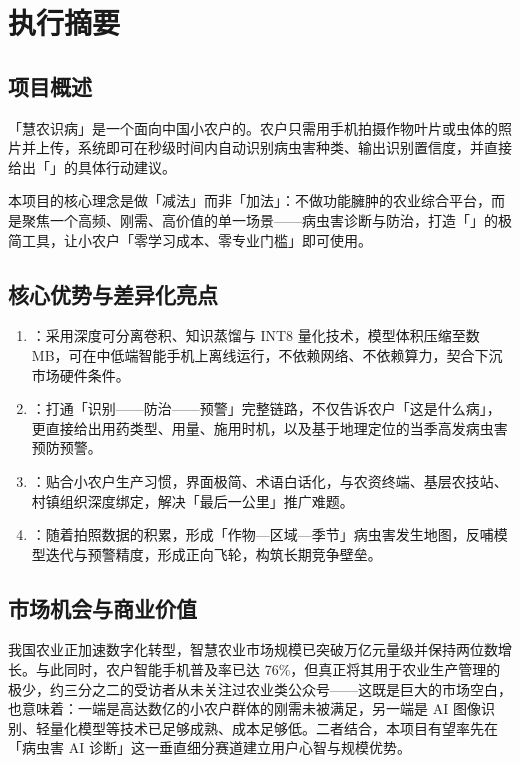 \chapter{执行摘要}

\section{项目概述}

「慧农识病」是一个面向中国小农户的。农户只需用手机拍摄作物叶片或虫体的照片并上传，系统即可在秒级时间内自动识别病虫害种类、输出识别置信度，并直接给出「」的具体行动建议。

本项目的核心理念是做「减法」而非「加法」：不做功能臃肿的农业综合平台，而是聚焦一个高频、刚需、高价值的单一场景——病虫害诊断与防治，打造「」的极简工具，让小农户「零学习成本、零专业门槛」即可使用。

\section{核心优势与差异化亮点}

\begin{enumerate}[leftmargin=1.6em]
  \item {}：采用深度可分离卷积、知识蒸馏与 INT8 量化技术，模型体积压缩至数 MB，可在中低端智能手机上离线运行，不依赖网络、不依赖算力，契合下沉市场硬件条件。
  \item {}：打通「识别——防治——预警」完整链路，不仅告诉农户「这是什么病」，更直接给出用药类型、用量、施用时机，以及基于地理定位的当季高发病虫害预防预警。
  \item {}：贴合小农户生产习惯，界面极简、术语白话化，与农资终端、基层农技站、村镇组织深度绑定，解决「最后一公里」推广难题。
  \item {}：随着拍照数据的积累，形成「作物—区域—季节」病虫害发生地图，反哺模型迭代与预警精度，形成正向飞轮，构筑长期竞争壁垒。
\end{enumerate}

\section{市场机会与商业价值}

我国农业正加速数字化转型，智慧农业市场规模已突破万亿元量级并保持两位数增长。与此同时，农户智能手机普及率已达 76\%，但真正将其用于农业生产管理的极少，约三分之二的受访者从未关注过农业类公众号——这既是巨大的市场空白，也意味着：一端是高达数亿的小农户群体的刚需未被满足，另一端是 AI 图像识别、轻量化模型等技术已足够成熟、成本足够低。二者结合，本项目有望率先在「病虫害 AI 诊断」这一垂直细分赛道建立用户心智与规模优势。

